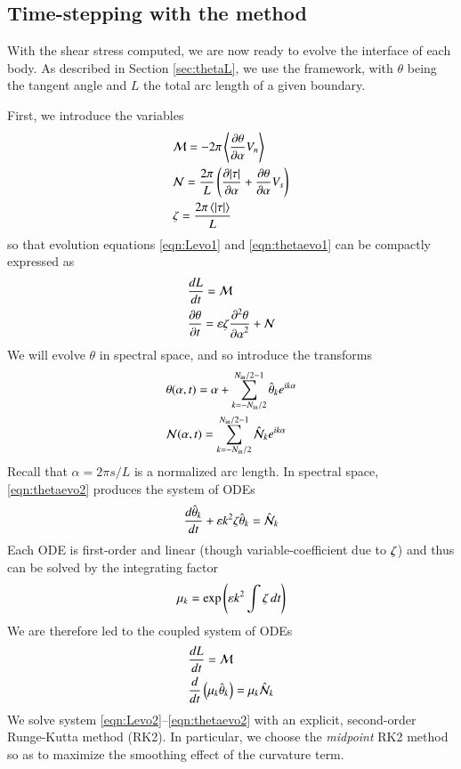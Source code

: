\documentclass[preprint, 10pt]{elsarticle}
\begin{document}
\subsection{Time-stepping with the {\thL} method} 

With the shear stress computed, we are now ready to evolve the interface of each body. As described in Section \ref{sec:thetaL}, we use the {\thL} framework, with $\theta$ being the tangent angle and $L$ the total arc length of a given boundary. 

First, we introduce the variables
\begin{align}
\label{eq:M}
& \mathcal{M} = - 2 \pi \left< \frac{\partial \theta}{\partial \alpha} V_n \right> \\
\label{eq:N}
& \mathcal{N} = \frac{2 \pi}{L} \left( \frac{\partial \lvert \tau \rvert}{\partial \alpha} + \frac{\partial \theta}{\partial \alpha} V_s \right) \\
\label{eq:elfun}
& \zeta = \frac{2 \pi  \left< \lvert \tau \rvert \right>}{L}
\end{align} 
so that evolution equations \eqref{eqn:Levo1} and \eqref{eqn:thetaevo1} can be compactly expressed as
\begin{align}
\label{eqn:Levo2}
& \frac{d L}{d t} = \mathcal{M} \\
\label{eqn:thetaevo2}
& \frac{\partial \theta}{\partial t} = \varepsilon \zeta \frac{\partial^2 \theta}{{\partial \alpha}^2} + \mathcal{N}
\end{align}
We will evolve $\theta$ in spectral space, and so introduce the transforms
\begin{align}
& \theta(\alpha,t) = \alpha + \sum_{k = -N_{\mathrm{in}} /2}^{N_{\mathrm{in}} /2-1} \hat{\theta}_k e^{ i k \alpha} \\
& \mathcal{N}(\alpha,t)  = \sum_{k = -N_{\mathrm{in}} /2}^{N_{\mathrm{in}} /2-1} \hat{\mathcal{N}}_k e^{ i k \alpha}
\end{align}
Recall that $\alpha = 2 \pi s / L$ is a normalized arc length. In spectral space, \eqref{eqn:thetaevo2} produces the system of ODEs
\begin{equation}
\frac{d \hat{\theta}_k}{d t} +  \varepsilon k^2  \zeta \hat{\theta}_k = \hat{\mathcal{N}}_k
\end{equation}
Each ODE is first-order and linear (though variable-coefficient due to $\zeta$) and thus can be solved by the integrating factor
\begin{equation}
\label{eq:mu}
\mu_k = \exp \left( \varepsilon k^2 \int \zeta \, dt \right)
\end{equation}
We are therefore led to the coupled system of ODEs
\begin{align}
\label{eqn:Levo2}
& \frac{d L}{d t} = \mathcal{M} \\
\label{eqn:thetaevo2}
& \frac{d }{d t}\left( \mu_k \hat{\theta}_k \right) = \mu_k \hat{\mathcal{N}}_k
\end{align}
We solve system \eqref{eqn:Levo2}--\eqref{eqn:thetaevo2} with an explicit, second-order Runge-Kutta method (RK2). In particular, we choose the {\em midpoint} RK2 method so as to maximize the smoothing effect of the curvature term.
\end{document}
